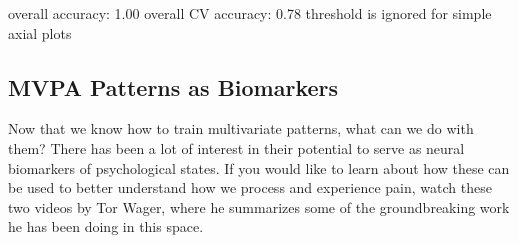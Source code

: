 \documentclass[letterpaper,10pt,english]{sphinxmanual}
\begin{document}
\begin{sphinxVerbatim}[commandchars=\\\{\}]
        
\end{sphinxVerbatim}

\begin{sphinxVerbatim}[commandchars=\\\{\}]
overall accuracy: 1.00
overall CV accuracy: 0.78
threshold is ignored for simple axial plots
\end{sphinxVerbatim}

\noindent{}

\noindent{}


\subsection{MVPA Patterns as Biomarkers}
\label{\detokenize{content/Multivariate_Prediction:mvpa-patterns-as-biomarkers}}
Now that we know how to train multivariate patterns, what can we do with them? There has been a lot of interest in their potential to serve as neural biomarkers of psychological states.  If you would like to learn about how these can be used to better understand how we process and experience pain, watch these two videos by Tor Wager, where he summarizes some of the groundbreaking work he has been doing in this space.

\begin{sphinxVerbatim}[commandchars=\\\{\}]
\end{sphinxVerbatim}
\end{document}
